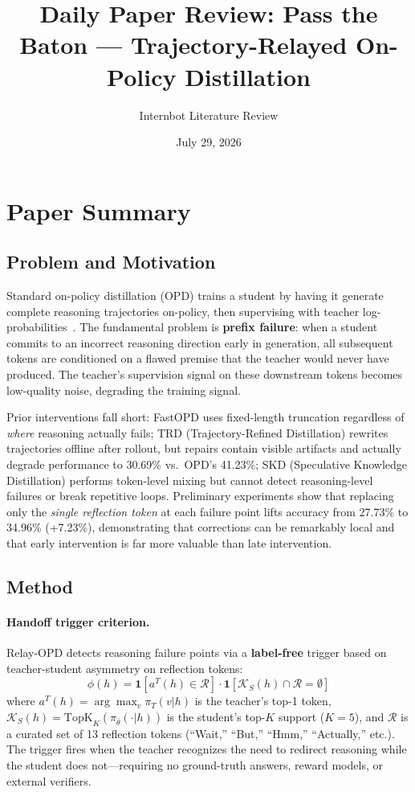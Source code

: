 \documentclass[11pt,a4paper]{article}
\title{Daily Paper Review: Pass the Baton --- Trajectory-Relayed On-Policy Distillation}
\author{Internbot Literature Review}
\date{July 29, 2026}
\begin{document}
\maketitle

\section{Paper Summary}

\subsection{Problem and Motivation}

Standard on-policy distillation (OPD) trains a student by having it generate complete reasoning trajectories on-policy, then supervising with teacher log-probabilities~\cite{xu2026relay}. The fundamental problem is \textbf{prefix failure}: when a student commits to an incorrect reasoning direction early in generation, all subsequent tokens are conditioned on a flawed premise that the teacher would never have produced. The teacher's supervision signal on these downstream tokens becomes low-quality noise, degrading the training signal.

Prior interventions fall short: FastOPD uses fixed-length truncation regardless of \emph{where} reasoning actually fails; TRD (Trajectory-Refined Distillation) rewrites trajectories offline after rollout, but repairs contain visible artifacts and actually degrade performance to 30.69\% vs.\ OPD's 41.23\%; SKD (Speculative Knowledge Distillation) performs token-level mixing but cannot detect reasoning-level failures or break repetitive loops. Preliminary experiments show that replacing only the \emph{single reflection token} at each failure point lifts accuracy from 27.73\% to 34.96\% (+7.23\%), demonstrating that corrections can be remarkably local and that early intervention is far more valuable than late intervention.

\subsection{Method}

\paragraph{Handoff trigger criterion.}
Relay-OPD detects reasoning failure points via a \textbf{label-free} trigger based on teacher-student asymmetry on reflection tokens:
\begin{equation}
    \phi(h) = \mathbf{1}[a^T(h) \in \mathcal{R}] \cdot \mathbf{1}[\mathcal{K}_S(h) \cap \mathcal{R} = \emptyset]
\end{equation}
where $a^T(h) = \arg\max_v \pi_T(v|h)$ is the teacher's top-1 token, $\mathcal{K}_S(h) = \text{TopK}_K(\pi_{\bar{\theta}}(\cdot|h))$ is the student's top-$K$ support ($K=5$), and $\mathcal{R}$ is a curated set of 13 reflection tokens (``Wait,'' ``But,'' ``Hmm,'' ``Actually,'' etc.). The trigger fires when the teacher recognizes the need to redirect reasoning while the student does not---requiring no ground-truth answers, reward models, or external verifiers.
\end{document}
